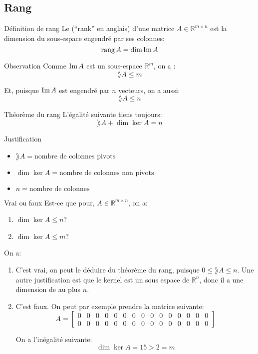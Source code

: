 \documentclass[a4paper]{article}
\begin{document}
\subsection{Rang}
\begin{parag}{Définition de rang}
    Le  (``rank'' en anglais) d'une matrice $A \in \mathbb{R}^{m \times n}$ est la dimension du sous-espace engendré par ses colonnes:
    \[\operatorname{rang} A = \dim \operatorname{Im} A\]
\end{parag}

\begin{parag}{Observation}
    Comme $\operatorname{Im} A$ est un sous-espace $\mathbb{R}^{m}$, on a :
    \[\rang A \leq m\]

    Et, puisque $\operatorname{Im} A$ est engendré par $n$ vecteurs, on a aussi:
    \[\rang A \leq n\]
\end{parag}

\begin{parag}{Théorème du rang}
    L'égalité suivante tiens toujours:
    \[\rang A + \dim \ker A = n\]

    \begin{subparag}{Justification}
        \begin{itemize}[left=0pt]
            \item $\rang A = \text{nombre de colonnes pivots}$
            \item $\dim\ker A = \text{nombre de colonnes non pivots}$
            \item $n = \text{nombre de colonnes}$
        \end{itemize}

    \end{subparag}
\end{parag}

\begin{parag}{Vrai ou faux}
    Est-ce que pour, $A \in \mathbb{R} ^{m \times n}$, on a:
    \begin{enumerate}
        \item $\dim\ker A \leq n$?
        \item $\dim\ker A \leq m$?
    \end{enumerate}

    On a:
    \begin{enumerate}
        \item C'est vrai, on peut le déduire du théorème du rang, puisque $0 \leq \rang A \leq n$. Une autre justification est que le kernel est un sous espace de $\mathbb{R}^{n}$, donc il a une dimension de au plus $n$.
        \item C'est faux. On peut par exemple prendre la matrice suivante:
            \setcounter{MaxMatrixCols}{20}
            \[A = \begin{bmatrix} 0 & 0 & 0 & 0 & 0 & 0 & 0 & 0 & 0 & 0 & 0 & 0 & 0 & 0 & 0 \\ 0 & 0 & 0 & 0 & 0 & 0 & 0 & 0 & 0 & 0 & 0 & 0 & 0 & 0 & 0 \end{bmatrix}\]
            \setcounter{MaxMatrixCols}{10}

            On a l'inégalité suivante:
            \[\dim\ker A = 15 > 2 = m\]
    \end{enumerate}
\end{parag}
\end{document}
